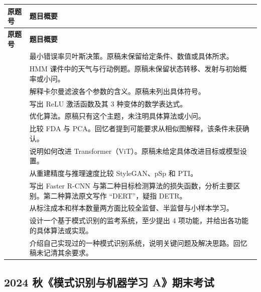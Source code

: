 \documentclass[UTF8,a4paper,zihao=-4,fontset=fandol]{ctexart}
\begin{document}
\begingroup
\small
\renewcommand{\arraystretch}{1.17}
\begin{longtable}{L{.14}L{.86}}
\toprule
{}
\textbf{原题号} & \textbf{题目概要} \\
\midrule
\endfirsthead
\toprule
{}
\textbf{原题号} & \textbf{题目概要} \\
\midrule
\endhead
\midrule
\endfoot
\bottomrule
{} & 最小错误率贝叶斯决策。原稿未保留给定条件、数值或具体所求。 \\
 & HMM 课件中的天气与行动例题。原稿未保留状态转移、发射与初始概率或小问。 \\
 & 解释卡尔曼滤波各个参数的含义。原稿未列出具体符号。 \\
 & 写出 ReLU 激活函数及其 3 种变体的数学表达式。 \\
 & 优化算法。原稿只有这个主题，未注明具体算法或小问。 \\
 & 比较 FDA 与 PCA。回忆者提到可能要求从相似图解释，该条件未获确认。 \\
 & 说明如何改进 Transformer（ViT）。原稿未给定具体改进目标或模型设置。 \\
 & 从重建精度与推理速度比较 StyleGAN、pSp 和 PTI。 \\
 & 写出 Faster R-CNN 与第二种目标检测算法的损失函数，分析主要区别。第二种算法原文写作 “DERT”，疑指 DETR。 \\
 & 从标注成本和样本数量两方面比较全监督、半监督与小样本学习。 \\
 & 设计一个基于模式识别的监考系统，至少提出 4 项功能，并给出各功能的具体算法或实现。 \\
 & 介绍自己实现过的一种模式识别系统，说明关键问题及解决思路。回忆稿未记清其余要求。 \\
\end{longtable}
\endgroup

\subsection{2024 秋《模式识别与机器学习 A》期末考试}
\end{document}
